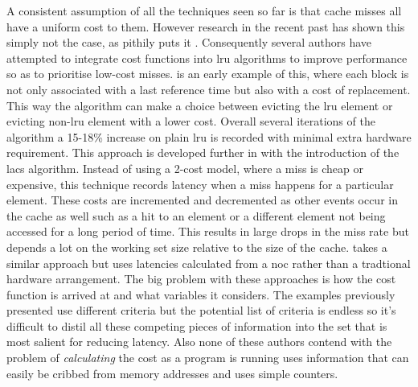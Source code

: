 A consistent assumption of all the techniques seen so far is that cache misses all have a uniform cost to them. However research in the recent past has shown this simply not the case, as \citet{qureshiCaseMLPAwareCache2006} pithily puts it . Consequently several authors have attempted to integrate cost functions into \gls{lru} algorithms to improve performance so as to prioritise low-cost misses. \citet{jeongCostsensitiveCacheReplacement2003} is an early example of this, where each block is not only associated with a last reference time but also with a cost of replacement. This way the algorithm can make a choice between evicting the \gls{lru} element or evicting non-\gls{lru} element with a lower cost. Overall several iterations of the algorithm a 15-18\% increase on plain \gls{lru} is recorded with minimal extra hardware requirement. This approach is developed further in \citet{kharbutliLACSLocalityAwareCostSensitive2014a} with the introduction of the \gls{lacs} algorithm. Instead of using a 2-cost model, where a miss is cheap or expensive, this technique records latency when a miss happens for a particular element. These costs are incremented and decremented as other events occur in the cache as well such as a hit to an element or a different element not being accessed for a long period of time. This results in large drops in the miss rate but depends a lot on the working set size relative to the size of the cache. \citet{dasLatencyAwareBlock2017} takes a similar approach but uses latencies calculated from a \gls{noc} rather than a tradtional hardware arrangement. The big problem with these approaches is how the cost function is arrived at and what variables it considers. The examples previously presented use different criteria but the potential list of criteria is endless so it's difficult to distil all these competing pieces of information into the set that is most salient for reducing latency. Also none of these authors contend with the problem of \emph{calculating} the cost as a program is running \citet{jeongCostsensitiveCacheReplacement2003} uses information that can easily be cribbed from memory addresses and \citet{kharbutliLACSLocalityAwareCostSensitive2014a} uses simple counters.


